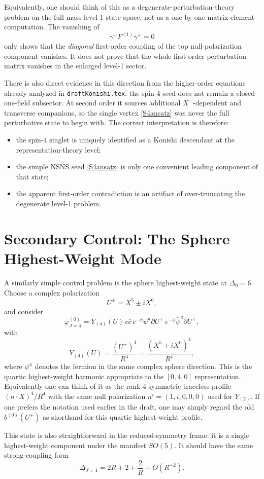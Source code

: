 \documentclass[12pt]{article}
\def\be{\begin{equation}}
\def\ee{\end{equation}}
\newcommand{\D}{\ensuremath{\Delta}}
\begin{document}
Equivalently, one should think of this as a degenerate-perturbation-theory problem on the full mass-level-1
state space, not as a one-by-one matrix element computation. The vanishing of
\be
\gamma^+F^{(1)}\gamma^+=0
\ee
only shows that the \emph{diagonal} first-order coupling of the top null-polarization component vanishes.
It does not prove that the whole first-order perturbation matrix vanishes in the enlarged level-1 sector.

There is also direct evidence in this direction from the higher-order equations already analyzed in
\texttt{draftKonishi.tex}: the spin-4 seed does not remain a closed one-field subsector. At second order it
sources additional $X^-$-dependent and transverse companions, so the single vertex \eqref{S4ansatz} was never
the full perturbative state to begin with. The correct interpretation is therefore:
\begin{itemize}
\item the spin-4 singlet is uniquely identified as a Konishi descendant at the representation-theory level;
\item the simple NSNS seed \eqref{S4ansatz} is only one convenient leading component of that state;
\item the apparent first-order contradiction is an artifact of over-truncating the degenerate level-1 problem.
\end{itemize}

\section{Secondary Control: The Sphere Highest-Weight Mode}

A similarly simple control problem is the sphere highest-weight state at $\D_0=6$.
Choose a complex polarization
\be
U^\pm = X^5 \pm i X^6,
\ee
and consider
\be
\varphi^{(0)}_{J=4}
=Y_{(4)}(U)\, c\bar c\, e^{-\phi}\psi^u\partial U^+\,
e^{-\bar\phi}\bar\psi^u\bar\partial U^+,
\ee
with
\be
Y_{(4)}(U)=\frac{(U^+)^4}{R^4}
=\frac{(X^5+iX^6)^4}{R^4},
\ee
where $\psi^u$ denotes the fermion in the same complex sphere direction.
This is the quartic highest-weight harmonic appropriate to the $[0,4,0]$ representation.
Equivalently one can think of it as the rank-4 symmetric traceless profile $(n\cdot X)^4/R^4$ with the
same null polarization $n^i=(1,i,0,0,0)$ used for $Y_{(2)}$.
If one prefers the notation used earlier in the draft, one may simply regard the old
$b^{(0)}(U^+)$ as shorthand for this quartic highest-weight profile.

This state is also straightforward in the reduced-symmetry frame: it is a single highest-weight
component under the manifest $SO(5)$. It should have the same strong-coupling form
\be
\D_{J=4}=2R+2+\frac{2}{R}+O(R^{-2}).
\ee
\end{document}
